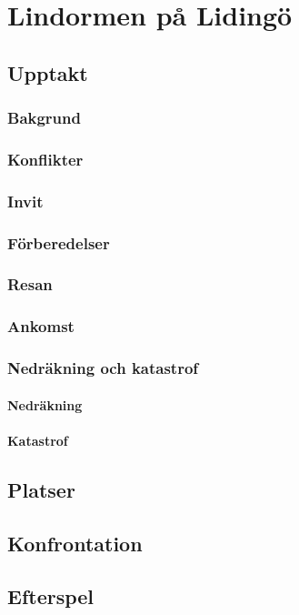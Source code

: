 \documentclass[12pt]{book}
\author{\authorname}
\title{\booktitle}
\date{\editionyear}
\begin{document}
\maketitle
	\chapter{Lindormen på Lidingö}
	\section{Upptakt}
		\subsection{Bakgrund}
		\subsection{Konflikter}
		\subsection{Invit}
		\subsection{Förberedelser}
		\subsection{Resan}
		\subsection{Ankomst}
		\subsection{Nedräkning och katastrof}
			\subsubsection{Nedräkning}
			\subsubsection{Katastrof}
	\section{Platser}
	\section{Konfrontation}
	\section{Efterspel}
\end{document}
